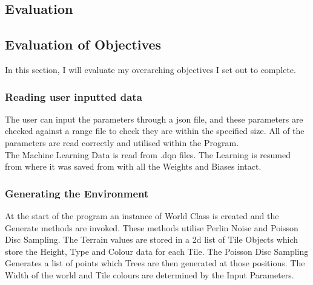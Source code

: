 \begin{flushleft}
    \huge
    \section{Evaluation}
    \vspace{0.1cm}

    \large
    \subsection{Evaluation of Objectives}
        \vspace{0.2cm}
        In this section, I will evaluate my overarching objectives I set out to complete.
        \vspace{0.2cm}

        \subsubsection{Reading user inputted data}
            \vspace{0.2cm}
            The user can input the parameters through a json file, and these parameters are checked against a range file to check they are within
            the specified size. All of the parameters are read correctly and utilised within the Program. \\
            \vspace{0.2cm}
            The Machine Learning Data is read from .dqn files. The Learning is resumed from where it was saved from with all the Weights and
            Biases intact. \\

            \vspace{0.5cm}    
        \subsubsection{Generating the Environment}
            \vspace{0.2cm}
            At the start of the program an instance of World Class is created and the Generate methods are invoked. These methods utilise Perlin
            Noise and Poisson Disc Sampling. The Terrain values are stored in a 2d list of Tile Objects which store the Height, Type and Colour data
            for each Tile. The Poisson Disc Sampling Generates a list of points which Trees are then generated at those positions. The Width
            of the world and Tile colours are determined by the Input Parameters. \\


\end{flushleft}
